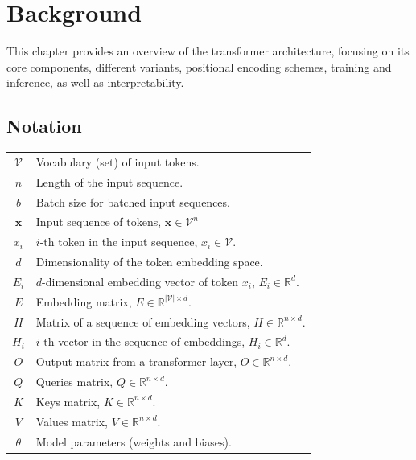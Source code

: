 \chapter{Background}\label{background}

This chapter provides an overview of the transformer architecture, focusing on its core components, different variants, positional encoding schemes, training and inference, as well as interpretability.

\section*{Notation}\label{sec:notation}

\begin{center}
    \begin{tabular}{cl}
        $\mathcal{V}$ \qquad & Vocabulary (set) of input tokens.                                           \\
        $n$                  & Length of the input sequence.                                               \\
        $b$                  & Batch size for batched input sequences.                                     \\
        $\mathbf{x}$         & Input sequence of tokens, $\mathbf{x} \in \mathcal{V}^{n}$                  \\
        $x_i$                & $i$-th token in the input sequence, $x_i \in \mathcal{V}$.                  \\
        $d$                  & Dimensionality of the token embedding space.                                \\
        $E_i$                & $d$-dimensional embedding vector of token $x_i$, $E_i \in \mathbb{R}^d$.    \\
        $E$                  & Embedding matrix, $E \in \mathbb{R}^{|\mathcal{V}| \times d}$.              \\
        $H$                  & Matrix of a sequence of embedding vectors, $H \in \mathbb{R}^{n \times d}$. \\
        $H_i$                & $i$-th vector in the sequence of embeddings, $H_i \in \mathbb{R}^d$.        \\
        $O$                  & Output matrix from a transformer layer, $O \in \mathbb{R}^{n \times d}$.    \\
        $Q$                  & Queries matrix, $Q \in \mathbb{R}^{n \times d}$.                            \\
        $K$                  & Keys matrix, $K \in \mathbb{R}^{n \times d}$.                               \\
        $V$                  & Values matrix, $V \in \mathbb{R}^{n \times d}$.                             \\
        $\theta$             & Model parameters (weights and biases).                                      \\
    \end{tabular}
\end{center}

